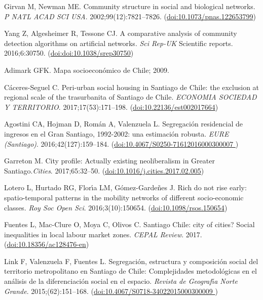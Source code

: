 \documentclass[%
preprint,
 amsmath,amssymb,
pra,
]{revtex4-1}
\begin{document}
\begin{thebibliography}{10}
Girvan M, Newman ME. Community structure in social and biological networks.
\emph{P NATL ACAD SCI USA}. 2002;99(12):7821--7826. (\href{https://dx.doi.org/10.1073/pnas.122653799}{doi:10.1073/pnas.122653799})

Yang Z, Algesheimer R, Tessone CJ. A comparative analysis of community detection algorithms on artificial networks. \emph{Sci Rep-UK} Scientific reports. 2016;6:30750. (\href{https://dx.doi.org/doi:10.1038/srep30750}{doi:doi:10.1038/srep30750})

Adimark GFK. Mapa socioecon{\'o}mico de Chile; 2009.

C\'aceres-Seguel C. Peri-urban social housing in Santiago de Chile: the exclusion at
  regional scale of the trasurbanita of Santiago de Chile. \emph{ECONOMIA SOCIEDAD Y TERRITORIO}. 2017;17(53):171--198. (\href{https://dx.doi.org/10.22136/est002017664}{doi:10.22136/est002017664})

Agostini CA, Hojman D, Rom{\'a}n A, Valenzuela L. Segregaci{\'o}n residencial de ingresos en el Gran Santiago, 1992-2002: una estimaci{\'o}n robusta.
\emph{EURE (Santiago)}. 2016;42(127):159--184. (\href{https://dx.doi.org/10.4067/S0250-71612016000300007 }{doi:10.4067/S0250-71612016000300007 })

Garreton M. {City profile: Actually existing neoliberalism in Greater Santiago}.\emph{Cities}. 2017;65:32--50. (\href{https://dx.doi.org/10.1016/j.cities.2017.02.005}{doi:10.1016/j.cities.2017.02.005})

Lotero L, Hurtado RG, Flor{\'\i}a LM, G{\'o}mez-Garde{\~n}es J. Rich do not rise early: spatio-temporal patterns in the mobility networks of different socio-economic classes. \emph{Roy Soc Open Sci}. 2016;3(10):150654. (\href{https://dx.doi.org/10.1098/rsos.150654}{doi:10.1098/rsos.150654})

Fuentes L, Mac-Clure O, Moya C, Olivos C. Santiago Chile: city of cities? Social inequalities in local labour
  market zones. \emph{CEPAL Review}. 2017. (\href{https://dx.doi.org/10.18356/ac128476-en}{doi:10.18356/ac128476-en})

Link F, Valenzuela F, Fuentes L. Segregaci{\'o}n, estructura y composici{\'o}n social del territorio metropolitano en Santiago de Chile: Complejidades metodol{\'o}gicas en el an{\'a}lisis de la diferenciaci{\'o}n social en el espacio. \emph{Revista de Geograf{\'\i}a Norte Grande}. 2015;(62):151--168. (\href{https://dx.doi.org/10.4067/S0718-34022015000300009 }{doi:10.4067/S0718-34022015000300009 })


\end{thebibliography}
\end{document}
